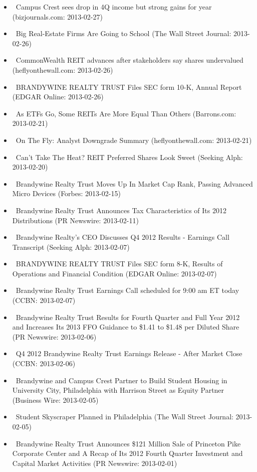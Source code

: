 \documentclass[11pt,asymmetric]{article}
\begin{document}
\begin{itemize}
\item\ Campus Crest sees drop in 4Q income but strong gains for year (bizjournals.com: 2013-02-27)
\item\ Big Real-Estate Firms Are Going to School (The Wall Street Journal: 2013-02-26)
\item\ CommonWealth REIT advances after stakeholders say shares undervalued (heflyonthewall.com: 2013-02-26)
\item\ BRANDYWINE REALTY TRUST Files SEC form 10-K, Annual Report (EDGAR Online: 2013-02-26)
\item\ As ETFs Go, Some REITs Are More Equal Than Others (Barrons.com: 2013-02-21)
\item\ On The Fly: Analyst Downgrade Summary (heflyonthewall.com: 2013-02-21)
\item\ Can't Take The Heat? REIT Preferred Shares Look Sweet (Seeking Alph: 2013-02-20)
\item\ Brandywine Realty Trust Moves Up In Market Cap Rank, Passing Advanced Micro Devices (Forbes: 2013-02-15)
\item\ Brandywine Realty Trust Announces Tax Characteristics of Its 2012 Distributions (PR Newswire: 2013-02-11)
\item\ Brandywine Realty's CEO Discusses Q4 2012 Results - Earnings Call Transcript (Seeking Alph: 2013-02-07)
\item\ BRANDYWINE REALTY TRUST Files SEC form 8-K, Results of Operations and Financial Condition (EDGAR Online: 2013-02-07)
\item\ Brandywine Realty Trust Earnings Call scheduled for 9:00 am ET today (CCBN: 2013-02-07)
\item\ Brandywine Realty Trust Results for Fourth Quarter and Full Year 2012 and Increases Its 2013 FFO Guidance to \$1.41 to \$1.48 per Diluted Share (PR Newswire: 2013-02-06)
\item\ Q4 2012 Brandywine Realty Trust Earnings Release - After Market Close (CCBN: 2013-02-06)
\item\ Brandywine and Campus Crest Partner to Build Student Housing in University City, Philadelphia with Harrison Street as Equity Partner (Business Wire: 2013-02-05)
\item\ Student Skyscraper Planned in Philadelphia (The Wall Street Journal: 2013-02-05)
\item\ Brandywine Realty Trust Announces \$121 Million Sale of Princeton Pike Corporate Center and A Recap of Its 2012 Fourth Quarter Investment and Capital Market Activities (PR Newswire: 2013-02-01)

\end{itemize}
\end{document}
